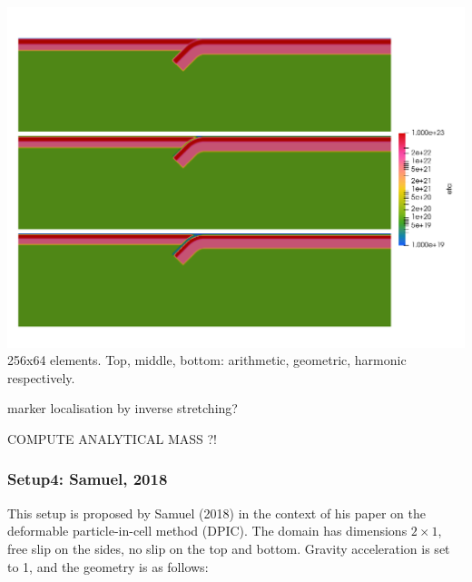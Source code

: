 \begin{center}
\includegraphics[width=14cm]{python_codes/fieldstone_67/images/eta_123}\\
{\captionfont 256x64 elements. Top, middle, bottom: arithmetic, geometric, harmonic respectively.}
\end{center}


marker localisation by inverse stretching?

COMPUTE ANALYTICAL MASS ?!

\newpage
\subsubsection*{Setup4: Samuel, 2018}

This setup is proposed by Samuel (2018) \cite{samu18} in the context of his paper 
on the deformable particle-in-cell method (DPIC).
The domain has dimensions $2 \times 1$, free slip on the sides, no slip on the top and bottom. 
Gravity acceleration is set to 1, and the geometry is as follows:

